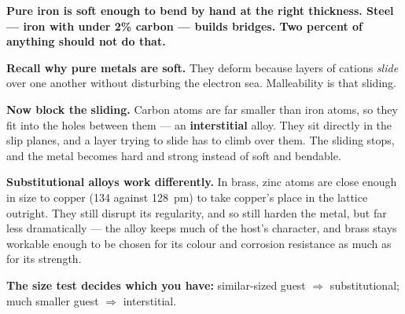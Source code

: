 \documentclass{apchem-worksheet}
\begin{document}
\begin{workedexample}
\textbf{Pure iron is soft enough to bend by hand at the right thickness.
Steel --- iron with under 2\% carbon --- builds bridges. Two percent of
anything should not do that.}

\textbf{Recall why pure metals are soft.} They deform because layers of
cations \emph{slide} over one another without disturbing the electron
sea. Malleability is that sliding.

\textbf{Now block the sliding.} Carbon atoms are far smaller than iron
atoms, so they fit into the holes between them --- an
\textbf{interstitial} alloy. They sit directly in the slip planes, and a
layer trying to slide has to climb over them. The sliding stops, and the
metal becomes hard and strong instead of soft and bendable.

\textbf{Substitutional alloys work differently.} In brass, zinc atoms
are close enough in size to copper (\SI{134}{} against
\SI{128}{\pico\metre}) to take copper's place in the lattice outright.
They still disrupt its regularity, and so still harden the metal, but far
less dramatically --- the alloy keeps much of the host's character, and
brass stays workable enough to be chosen for its colour and corrosion
resistance as much as for its strength.

\textbf{The size test decides which you have:} similar-sized guest
$\Rightarrow$ substitutional; much smaller guest $\Rightarrow$
interstitial.
\end{workedexample}
\end{document}
